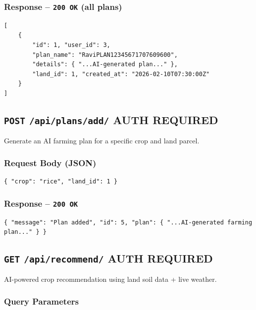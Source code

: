 \documentclass[11pt,a4paper]{article}
\newcommand{\authbadge}{\textcolor{lockgold}{\textbf{AUTH REQUIRED}}}
\newcommand{\httpmethod}[1]{\texttt{\textbf{#1}}}
\begin{document}
\subsubsection*{Response -- \texttt{200 OK} (all plans)}
\begin{lstlisting}[style=jsonStyle]
[
    {
        "id": 1, "user_id": 3,
        "plan_name": "RaviPLAN12345671707609600",
        "details": { "...AI-generated plan..." },
        "land_id": 1, "created_at": "2026-02-10T07:30:00Z"
    }
]
\end{lstlisting}

\subsection{\httpmethod{POST} \texttt{/api/plans/add/} \hfill \authbadge}

Generate an AI farming plan for a specific crop and land parcel.

\subsubsection*{Request Body (JSON)}
\begin{lstlisting}[style=jsonStyle]
{ "crop": "rice", "land_id": 1 }
\end{lstlisting}

\subsubsection*{Response -- \texttt{200 OK}}
\begin{lstlisting}[style=jsonStyle]
{ "message": "Plan added", "id": 5, "plan": { "...AI-generated farming plan..." } }
\end{lstlisting}

\subsection{\httpmethod{GET} \texttt{/api/recommend/} \hfill \authbadge}

AI-powered crop recommendation using land soil data + live weather.

\subsubsection*{Query Parameters}
\end{document}

